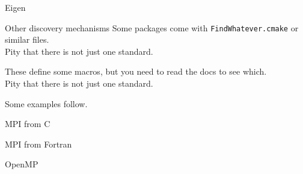 \begin{numberedframe}{Eigen}
  \lstset{numbers=left,numberstyle=\tiny}
  
\end{numberedframe}

\begin{numberedframe}{Other discovery mechanisms}
  Some packages come with \texttt{FindWhatever.cmake}
  or similar files.\\
  Pity that there is not just one standard.

  These define some macros, but you need to read the docs
  to see which.\\
  Pity that there is not just one standard.

  Some examples follow.
\end{numberedframe}

\begin{numberedframe}{MPI from C}
  \tiny
  \lstset{numbers=left,numberstyle=\tiny}
  
\end{numberedframe}

\begin{numberedframe}{MPI from Fortran}
  \tiny
  \lstset{numbers=left,numberstyle=\tiny}
  
\end{numberedframe}

\begin{numberedframe}{OpenMP}
  \lstset{numbers=left,numberstyle=\tiny}
  
\end{numberedframe}

\endinput

\begin{numberedframe}{}
  \begin{itemize}
  \item 
  \end{itemize}
\begin{lstlisting}
\end{lstlisting}
\end{numberedframe}

